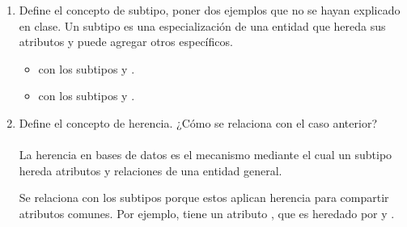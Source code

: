 \begin{enumerate}[label=\textbf{\arabic*.}, itemsep=0.5em]
        \item Define el concepto de subtipo, poner dos ejemplos que no se hayan explicado en clase.  
        Un subtipo es una especialización de una entidad que hereda sus atributos y puede agregar otros específicos.  
        
        \begin{itemize}
            \item {} con los subtipos  y .
            \item {} con los subtipos  y .
        \end{itemize}
        
        \item Define el concepto de herencia. ¿Cómo se relaciona con el caso anterior?  \\\\
        La herencia en bases de datos es el mecanismo mediante el cual un subtipo hereda atributos y relaciones de una entidad general.  
        
        Se relaciona con los subtipos porque estos aplican herencia para compartir atributos comunes. Por ejemplo,  tiene un atributo , que es heredado por  y .
        

\end{enumerate}
